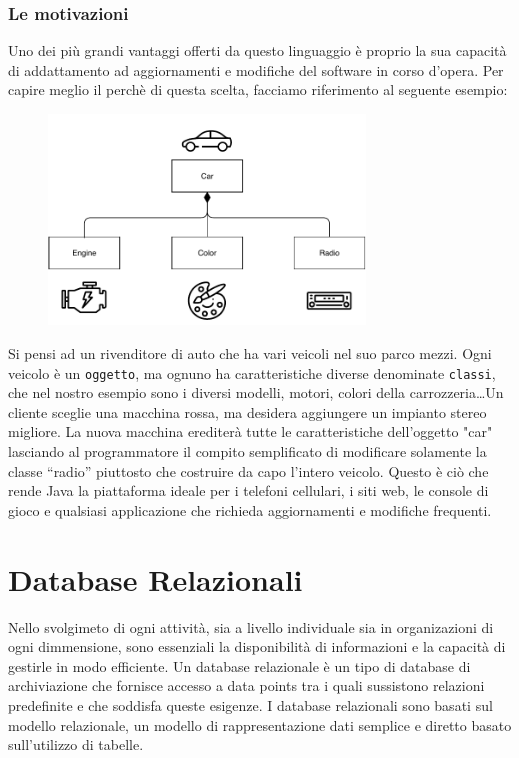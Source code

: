 \subsubsection{Le motivazioni}
Uno dei più grandi vantaggi offerti da questo linguaggio è proprio la sua capacità di addattamento ad aggiornamenti e modifiche del software in corso d'opera. Per capire meglio il perchè di questa scelta, facciamo riferimento al seguente esempio:
\begin{figure}[H]
    \centering
    \includegraphics[width=0.75\textwidth]{images/01_5_java_class_diagram.pdf}
\end{figure}
Si pensi ad un rivenditore di auto che ha vari veicoli nel suo parco mezzi. Ogni veicolo è un \texttt{oggetto}, ma ognuno ha caratteristiche diverse denominate \texttt{classi}, che nel nostro esempio sono i diversi modelli, motori, colori della carrozzeria\dots Un cliente sceglie una macchina rossa, ma desidera aggiungere un impianto stereo migliore. La nuova macchina erediterà tutte le caratteristiche dell'oggetto "car" lasciando al programmatore il compito semplificato di modificare solamente la classe “radio” piuttosto che costruire da capo l’intero veicolo. Questo è ciò che rende Java la piattaforma ideale per i telefoni cellulari, i siti web, le console di gioco e qualsiasi applicazione che richieda aggiornamenti e modifiche frequenti.

\section{Database Relazionali}
Nello svolgimeto di ogni attività, sia a livello individuale sia in organizazioni di ogni dimmensione, sono essenziali la disponibilità di informazioni e la capacità di gestirle in modo efficiente. \cite{book:basididati} Un database relazionale è un tipo di database di archiviazione che fornisce accesso a data points tra i quali sussistono relazioni predefinite e che soddisfa queste esigenze. I database relazionali sono basati sul modello relazionale, un modello di rappresentazione dati semplice e diretto basato sull'utilizzo di tabelle.

